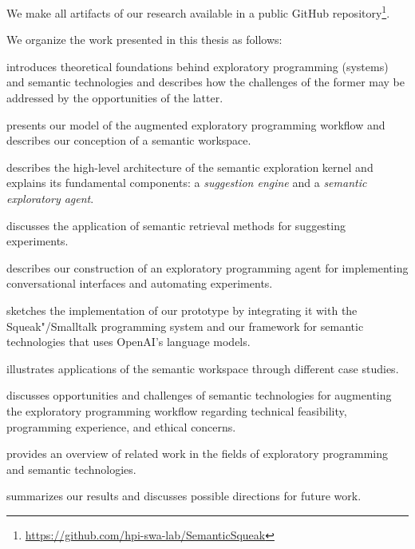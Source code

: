 We make all artifacts of our research available in a public GitHub repository\footnote{\url{https://github.com/hpi-swa-lab/SemanticSqueak}}. %

We organize the work presented in this thesis as follows:
%
\begin{description}[noextralabelsep]
	\item[\Cref{cha:background}] introduces theoretical foundations behind exploratory programming (systems) and semantic technologies and describes how the challenges of the former may be addressed by the opportunities of the latter.
	\item[\Cref{cha:approach}] presents our model of the augmented exploratory programming workflow and describes our conception of a semantic workspace.
	\item[\Cref{cha:design}] describes the high-level architecture of the semantic exploration kernel and explains its fundamental components: a \emph{suggestion engine} and a \emph{semantic exploratory agent}.
	\item[\Cref{cha:suggestions}] discusses the application of semantic retrieval methods for suggesting experiments.
	\item[\Cref{cha:agent}] describes our construction of an exploratory programming agent for implementing conversational interfaces and automating experiments. %
	\item[\Cref{cha:implementation}] sketches the implementation of our prototype by integrating it with the Squeak"/Smalltalk programming system and our \semtex framework for semantic technologies that uses OpenAI's language models.
	\item[\Cref{cha:application}] illustrates applications of the semantic workspace through dif\-fer\-ent case studies.
	\item[\Cref{cha:discussion}] discusses opportunities and challenges of semantic technologies for augmenting the exploratory programming workflow regarding technical feasibility, programming experience, and ethical concerns.
	\item[\Cref{cha:related_work}] provides an overview of related work in the fields of exploratory programming and semantic technologies.
	\item[\Cref{cha:conclusion}] summarizes our results and discusses possible directions for future work.
\end{description}
